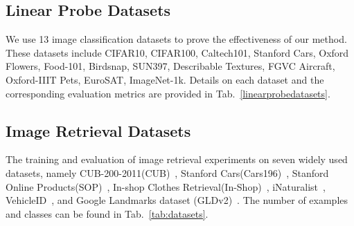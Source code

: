 \documentclass{article} \usepackage{iclr2023_conference,times}
\begin{document}
\subsection{Linear Probe Datasets}
We use 13 image classification datasets to prove the effectiveness of our method. These
datasets include CIFAR10\citep{krizhevsky2009learning}, CIFAR100\citep{krizhevsky2009learning}, Caltech101\citep{fei2004learning}, Stanford Cars\citep{krause2013collecting}, Oxford Flowers\citep{nilsback2008automated}, Food-101\citep{bossard2014food}, Birdsnap\citep{berg2014birdsnap}, SUN397\citep{xiao2010sun}, Describable Textures\citep{cimpoi2014describing}, FGVC Aircraft\citep{maji2013fine}, Oxford-IIIT Pets\citep{parkhi2012cats}, EuroSAT\citep{helber2019eurosat}, ImageNet-1k\citep{ILSVRC15}. 
Details on each dataset and the corresponding evaluation metrics are provided in Tab.~\ref{linearprobedatasets}.

\subsection{Image Retrieval Datasets}
The training and evaluation of image retrieval experiments on seven widely used datasets, namely CUB-200-2011(CUB)~\citep{wbm+10}, Stanford Cars(Cars196)~\citep{ksd+13}, Stanford Online Products(SOP)~\citep{oh2016deep}, In-shop Clothes Retrieval(In-Shop)~\citep{liu2016deepfashion}, iNaturalist~\citep{van2018inaturalist}, VehicleID~\citep{liuhongye2016vehicles}, and Google Landmarks
dataset (GLDv2)~\citep{weyand2020google}. 
The number of examples and classes can be found in Tab.~\ref{tab:datasets}.
\end{document}
